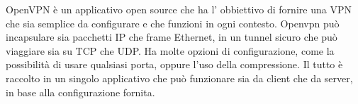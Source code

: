 OpenVPN è un applicativo open source che ha l' obbiettivo di fornire una VPN che sia semplice da configurare e che funzioni in ogni contesto. Openvpn può incapsulare sia pacchetti IP che frame Ethernet, in un tunnel sicuro che può viaggiare sia su TCP che UDP. Ha molte opzioni di configurazione, come la possibilità di usare qualsiasi porta, oppure l'uso della compressione. Il tutto è raccolto in un singolo applicativo che può funzionare sia da client che da server, in base alla configurazione fornita.

